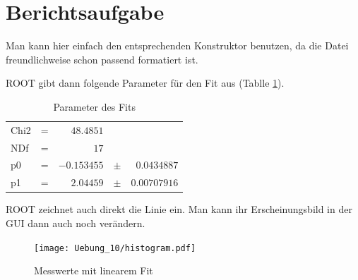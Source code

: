 \section{Berichtsaufgabe}

Man kann hier einfach den entsprechenden Konstruktor benutzen, da die Datei freundlichweise schon passend formatiert ist.


ROOT gibt dann folgende Parameter für den Fit aus (Tablle \ref{table:fit}).

\begin{table}[h]
\begin{center}
\begin{tabular}{lcrcr}
Chi2 & = & $48.4851$ &  \\ 
NDf & = & $17$ &  \\ 
p0 & = & $-0.153455$ & $\pm$ & $0.0434887$ \\ 
p1 & = & $2.04459$ & $\pm$ & $0.00707916$ \\ 
\end{tabular} 
\caption{Parameter des Fits}
\label{table:fit}
\end{center}
\end{table}

ROOT zeichnet auch direkt die Linie ein. Man kann ihr Erscheinungsbild in der GUI dann auch noch verändern.


\begin{figure}[h]
\begin{center}
\texttt{[image: Uebung\_10/histogram.pdf]}
\caption{Messwerte mit linearem Fit}
\end{center}
\end{figure}
